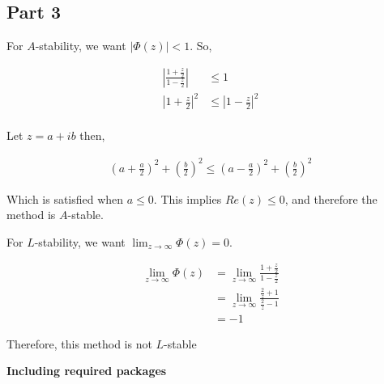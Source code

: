 \documentclass[12pt,a4paper]{article}
\begin{document}
\subsection{Part 3}%
\label{sub:part_3}

\par For $A$-stability, we want $|\Phi (z)| < 1$.  So, 

\begin{align*}
  \left|\frac{ 1 + \frac{z}{2} }{1 - \frac{z}{2}}\right| &\leq 1\\
  \left|1 + \frac{z}{2}\right|^{2} &\leq \left|1 - \frac{z}{2} \right|^{2} \\
\end{align*}

\par Let $z = a+ib$ then,

\begin{align*}
  \left(a + \frac{a}{2}\right)^{2} + \left( \frac{b}{2}\right)^{2} \leq \left(
  a- \frac{a}{2}\right)^{2} + \left(\frac{b}{2}\right)^{2}
\end{align*}

Which is satisfied when $a \leq 0$. This implies  $Re(z) \leq 0$, and therefore
the method is  $A$-stable.

\vspace{15px}
For $L$-stability, we want $ \lim_{z \to \infty} \Phi (z) = 0 $.

\begin{align*}
  \lim_{z \to \infty} \Phi (z) &=\lim_{z \to \infty} \frac{ 1 + \frac{z}{2} }{1
  - \frac{z}{2}}\\
                               &= \lim_{z \to \infty} \frac{ \frac{2}{z} + 1 }{
                               \frac{2}{z} - 1} \\
                               &= -1
\end{align*}

Therefore, this method is not $L$-stable

\vspace{20px}
\bf{Including required packages}
\end{document}
